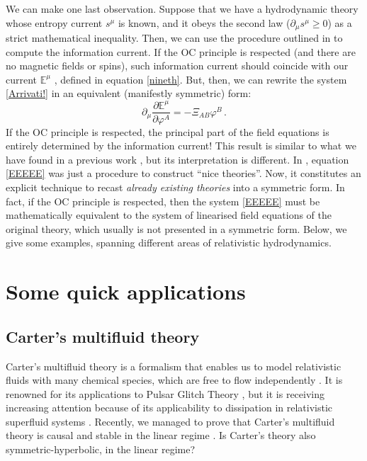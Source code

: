 \documentclass[a4paper, amsfonts, amssymb, amsmath, reprint, showkeys, nofootinbib, twoside, onecolumn,notitlepage]{revtex4-1}
\begin{document}
We can make one last observation. Suppose that we have a hydrodynamic theory whose entropy current $s^\mu$ is known, and it obeys the second law ($\partial_\mu s^\mu \geq 0$) as a strict mathematical inequality. Then, we can use the procedure outlined in \cite{GavassinoGibbs2021} to compute the information current. If the OC principle is respected (and there are no magnetic fields or spins), such information current should coincide with our current $\mathbb{E}^\mu$ \cite{GavassinoCausality2021}, defined in equation \eqref{nineth}. But, then, we can rewrite the system \eqref{Arrivati!} in an equivalent (manifestly symmetric) form:
\begin{equation}\label{EEEEE}
\partial_\mu \dfrac{\partial \mathbb{E}^\mu}{\partial \varphi^A} = -\Xi_{AB} \varphi^B \, .
\end{equation}
If the OC principle is respected, the principal part of the field equations is entirely determined by the information current! This result is similar to what we have found in a previous work \cite{GavassinoNonHydro2022}, but its interpretation is different. In \cite{GavassinoNonHydro2022}, equation \eqref{EEEEE} was just a procedure to construct ``nice theories''. Now, it constitutes an explicit technique to recast \textit{already existing theories} into a symmetric form. In fact, if the OC principle is respected, then the system \eqref{EEEEE} must be mathematically equivalent to the system of linearised field equations of the original theory, which usually is not presented in a symmetric form. Below, we give some examples, spanning different areas of relativistic hydrodynamics. 

\section{Some quick applications}


\subsection{Carter's multifluid theory}

Carter's multifluid theory is a formalism that enables us to model relativistic fluids with many chemical species, which are free to flow independently \cite{carter1991,Carter_starting_point,Andersson_2017,Termo}. It is renowned for its applications to Pulsar Glitch Theory \cite{langlois98,sourie_glitch2017,chamel_review_crust,
Geo2020,GavassinoIordanskii2021}, but it is receiving increasing attention because of its applicability to dissipation in relativistic superfluid systems \cite{Gusakov08,RauWasserman2020,GavassinoKhalatnikov2022}. Recently, we managed to prove that Carter's multifluid theory is causal and stable in the linear regime \cite{GavassinoStabilityCarter2022}. Is Carter's theory also symmetric-hyperbolic, in the linear regime?
\end{document}
